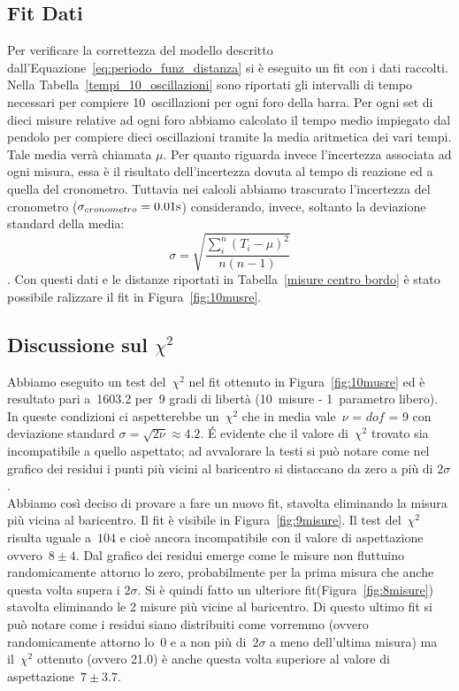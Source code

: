 \documentclass[a4paper,12pt]{article}
\begin{document}
\subsection{Fit Dati}
Per verificare la correttezza del modello descritto dall'Equazione~\ref{eq:periodo_funz_distanza} si è eseguito un fit con i dati raccolti. Nella Tabella~\ref{tempi_10_oscillazioni} sono riportati gli intervalli di tempo necessari per compiere 10~oscillazioni per ogni foro della barra. Per ogni set di dieci misure relative ad ogni foro abbiamo calcolato il tempo medio impiegato dal pendolo per compiere dieci oscillazioni tramite la media aritmetica dei vari tempi. Tale media verrà chiamata $\mu$. Per quanto riguarda invece l'incertezza associata ad ogni misura, essa è il risultato dell'incertezza dovuta al tempo di reazione ed a quella del cronometro. Tuttavia nei calcoli abbiamo trascurato l'incertezza del cronometro ($\sigma_{cronometro}=0.01\rm s$) considerando, invece, soltanto la deviazione standard della media:
\begin{equation}
   \displaystyle \sigma =\sqrt{\dfrac{\sum\limits_i^n(T_i-\mu)^2}{n(n-1)}}
\end{equation}.
Con questi dati e le distanze riportati in Tabella~\ref{misure centro bordo} è stato possibile ralizzare il fit in Figura~\ref{fig:10musre}.

\subsection{Discussione sul $\chi^2$}
Abbiamo eseguito un test del~$\chi^2$ nel fit ottenuto in Figura~\ref{fig:10musre} ed è resultato pari a~1603.2 per~9 gradi di libertà (10~misure - 1~parametro libero). In queste condizioni ci aspetterebbe un~$\chi^2$ che in media vale~$\nu$ = $dof$ = 9 con deviazione standard $\sigma = \sqrt{2 \nu} \approx 4.2$. \'E evidente che il valore di~$\chi^2$ trovato sia incompatibile a quello aspettato; ad avvalorare la testi si può notare come nel grafico dei residui i punti più vicini al baricentro si distaccano da zero a più di $2\sigma$.\\
Abbiamo così deciso di provare a fare un nuovo fit, stavolta eliminando la misura più vicina al baricentro. Il fit è visibile in Figura~\ref{fig:9misure}{}. Il test del~$\chi^2$ risulta uguale a~$104$ e cioè ancora incompatibile con il valore di aspettazione ovvero~$8\pm4$. Dal grafico dei residui emerge come le misure non fluttuino randomicamente attorno lo zero, probabilmente per la prima misura che anche questa volta supera i $2\sigma$. Si è quindi fatto un ulteriore fit(Figura~\ref{fig:8misure}) stavolta eliminando le 2 misure più vicine al baricentro. Di questo ultimo fit si può notare come i residui siano distribuiti come vorremmo (ovvero randomicamente attorno lo~0 e a non più di~$2\sigma$ a meno dell'ultima misura) ma il~$\chi^2$ ottenuto (ovvero 21.0) è anche questa volta superiore al valore di aspettazione~$7\pm3.7$.
\end{document}
